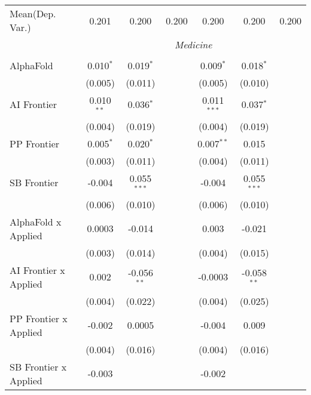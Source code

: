 \begin{tabular}{lcccccc}
Mean(Dep. Var.) & 0.201 & 0.200 & 0.200 & 0.200 & 0.200 & 0.200 \\
 & \multicolumn{6}{c}{\textit{Medicine}} \\ \\
   AlphaFold                      & 0.010$^{*}$  & 0.019$^{*}$   &               & 0.009$^{*}$   & 0.018$^{*}$   &   \\   
                                  & (0.005)      & (0.011)       &               & (0.005)       & (0.010)       &   \\   
   AI Frontier                    & 0.010$^{**}$ & 0.036$^{*}$   &               & 0.011$^{***}$ & 0.037$^{*}$   &   \\   
                                  & (0.004)      & (0.019)       &               & (0.004)       & (0.019)       &   \\   
   PP Frontier                    & 0.005$^{*}$  & 0.020$^{*}$   &               & 0.007$^{**}$  & 0.015         &   \\   
                                  & (0.003)      & (0.011)       &               & (0.004)       & (0.011)       &   \\   
   SB Frontier                    & -0.004       & 0.055$^{***}$ &               & -0.004        & 0.055$^{***}$ &   \\   
                                  & (0.006)      & (0.010)       &               & (0.006)       & (0.010)       &   \\   
   AlphaFold x Applied            & 0.0003       & -0.014        &               & 0.003         & -0.021        &   \\   
                                  & (0.003)      & (0.014)       &               & (0.004)       & (0.015)       &   \\   
   AI Frontier x Applied          & 0.002        & -0.056$^{**}$ &               & -0.0003       & -0.058$^{**}$ &   \\   
                                  & (0.004)      & (0.022)       &               & (0.004)       & (0.025)       &   \\   
   PP Frontier x Applied          & -0.002       & 0.0005        &               & -0.004        & 0.009         &   \\   
                                  & (0.004)      & (0.016)       &               & (0.004)       & (0.016)       &   \\   
   SB Frontier x Applied          & -0.003       &               &               & -0.002        &               &   \\   

\end{tabular}
